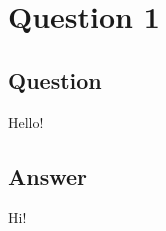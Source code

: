 \documentclass[a4paper, 12pt]{scrartcl}
\newcommand{\newpar}{\vspace{0.5cm}\noindent}
\newenvironment{question}[1]{
    \section*{Question #1}
    \subsection*{Question}
    \begin{itshape}
}
{
    \end{itshape}
}
\newenvironment{answer}{
    \subsection*{Answer}
}{\newpar}
\begin{document}
\maketitle

\begin{question}{1}
    Hello!
\end{question}
\begin{answer}
    Hi!
\end{answer}
\end{document}
